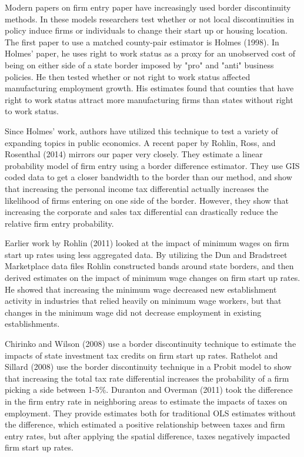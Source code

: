 Modern papers on firm entry paper have increasingly used border discontinuity methods. In these models researchers test whether or not local discontinuities in policy induce firms or individuals to change their start up or housing location. The first paper to use a matched county-pair estimator is Holmes (1998). In Holmes' paper, he uses right to work status as a proxy for an unobserved cost of being on either side of a state border imposed by "pro" and "anti" business policies. He then tested whether or not right to work status affected manufacturing employment growth. His estimates found that counties that have right to work status attract more manufacturing firms than states without right to work status.

Since Holmes' work, authors have utilized this technique to test a variety of expanding topics in public economics. A recent paper by Rohlin, Ross, and Rosenthal (2014) mirrors our paper very closely. They estimate a linear probability model of firm entry using a border difference estimator. They use GIS coded data to get a closer bandwidth to the border than our method, and show that increasing the personal income tax differential actually increases the likelihood of firms entering on one side of the border. However, they show that increasing the corporate and sales tax differential can drastically reduce the relative firm entry probability.

Earlier work by Rohlin (2011) looked at the impact of minimum wages on firm start up rates using less aggregated data. By utilizing the Dun and Bradstreet Marketplace data files Rohlin constructed bands around state borders, and then derived estimates on the impact of minimum wage changes on firm start up rates. He showed that increasing the minimum wage decreased new establishment activity in industries that relied heavily on minimum wage workers, but that changes in the minimum wage did not decrease employment in existing establishments.

Chirinko and Wilson (2008) use a border discontinuity technique to estimate the impacts of state investment tax credits on firm start up rates. Rathelot and Sillard (2008) use the border discontinuity technique in a Probit model to show that increasing the total tax rate differential increases the probability of a firm picking a side between 1-5\%. Duranton and Overman (2011) took the difference in the firm entry rate in neighboring areas to estimate the impacts of taxes on employment. They provide estimates both for traditional OLS estimates without the difference, which estimated a positive relationship between taxes and firm entry rates, but after applying the spatial difference, taxes negatively impacted firm start up rates.

